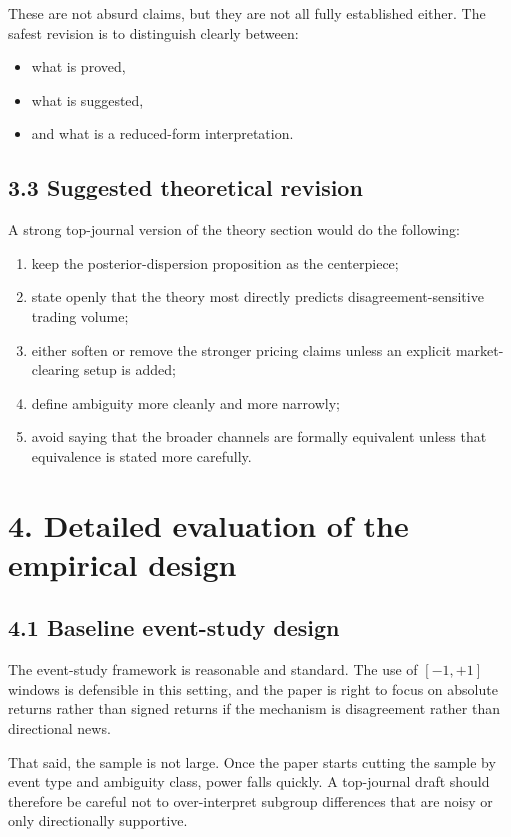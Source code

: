These are not absurd claims, but they are not all fully established either. The safest revision is to distinguish clearly between:
\begin{itemize}[leftmargin=1.5em]
    \item what is proved,
    \item what is suggested,
    \item and what is a reduced-form interpretation.
\end{itemize}

\subsection*{3.3 Suggested theoretical revision}

A strong top-journal version of the theory section would do the following:
\begin{enumerate}[leftmargin=1.5em]
    \item keep the posterior-dispersion proposition as the centerpiece;
    \item state openly that the theory most directly predicts disagreement-sensitive trading volume;
    \item either soften or remove the stronger pricing claims unless an explicit market-clearing setup is added;
    \item define ambiguity more cleanly and more narrowly;
    \item avoid saying that the broader channels are formally equivalent unless that equivalence is stated more carefully.
\end{enumerate}

\section*{4. Detailed evaluation of the empirical design}

\subsection*{4.1 Baseline event-study design}

The event-study framework is reasonable and standard. The use of $[-1,+1]$ windows is defensible in this setting, and the paper is right to focus on absolute returns rather than signed returns if the mechanism is disagreement rather than directional news.

That said, the sample is not large. Once the paper starts cutting the sample by event type and ambiguity class, power falls quickly. A top-journal draft should therefore be careful not to over-interpret subgroup differences that are noisy or only directionally supportive.

